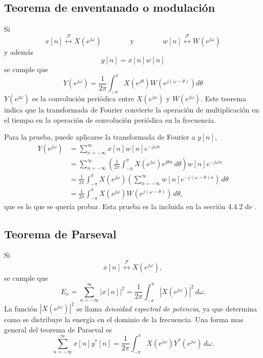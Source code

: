 \documentclass[a4paper]{report}
\begin{document}
\subsection{Teorema de enventanado o modulación}\label{sec:seq_and_sys_modulation_theorem}

Si
\[
 x[n]\overset{\mathcal{F}}{\longleftrightarrow}X(e^{j\omega})
 \qquad\qquad\textrm{y}\qquad\qquad
 w[n]\overset{\mathcal{F}}{\longleftrightarrow}W(e^{j\omega})
\]
y además
\[
 y[n]=x[n]w[n]
\]
se cumple que
\[
 Y(e^{j\omega})=\frac{1}{2\pi}\int_{-\pi}^{\pi}X(e^{j\theta})W(e^{j(\omega-\theta)})d\theta
\]
\(Y(e^{j\omega})\) es la convolución periódica entre \(X(e^{j\omega})\) y \(W(e^{j\omega})\). Este teorema indica que la transformada de Fourier convierte la operación de multiplicación en el tiempo en la operación de convolución periódica en la frecuencia.

Para la prueba, puede aplicarse la transformada de Fourier a \(y[n]\),
\begin{align*}
 Y(e^{j\omega})&=\sum_{n=-\infty}^\infty x[n]w[n]e^{-j\omega n}\\
   &=\sum_{n=-\infty}^\infty\left(\frac{1}{2\pi}\int_{-\pi}^\pi X(e^{j\omega})e^{j\theta n}\,d\theta\right)w[n]e^{-j\omega n}\\
   &=\frac{1}{2\pi}\int_{-\pi}^\pi X(e^{j\omega})\left(\sum_{n=-\infty}^\infty w[n]e^{-j(\omega-\theta)n}\right)\,d\theta\\
   &=\frac{1}{2\pi}\int_{-\pi}^\pi X(e^{j\omega})W(e^{j(\omega-\theta)})\,d\theta,
\end{align*}
que es lo que se quería probar. Esta prueba es la incluida en la sección 4.4.2 de \cite{proakis06digital}.

\subsection{Teorema de Parseval}

Si
\[
x[n]\overset{\mathcal{F}}{\longleftrightarrow}X(e^{j\omega}),
\]
se cumple que
\[
 E_x=\sum_{n=-\infty}^{\infty}|x[n]|^2=\frac{1}{2\pi}\int_{-\pi}^{\pi}|X(e^{j\omega})|^2\,d\omega.
\]
La función \(|X(e^{j\omega})|^2\) se llama \emph{densidad espectral de potencia}, ya que determina como se distribuye la energía en el dominio de la frecuencia. Una forma mas general del teorema de Parseval es
\begin{equation}\label{eq:seq_and_sys_parseval_theorem}
 \sum_{n=-\infty}^{\infty}x[n]y^*[n]=\frac{1}{2\pi}\int_{-\pi}^{\pi}X(e^{j\omega})Y^*(e^{j\omega})\,d\omega. 
\end{equation}
\end{document}
